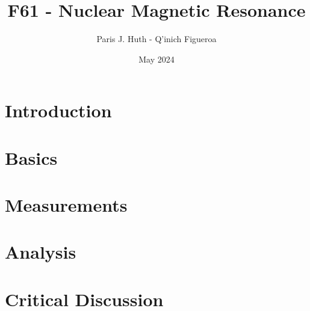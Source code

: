\documentclass{article}
\title{F61 - Nuclear Magnetic Resonance}
\author{Paris J. Huth - Q'inich Figueroa}
\date{May 2024}
\begin{document}
\maketitle

\section{Introduction}
\section{Basics}
\section{Measurements}

\section{Analysis}
\section{Critical Discussion}
\end{document}
